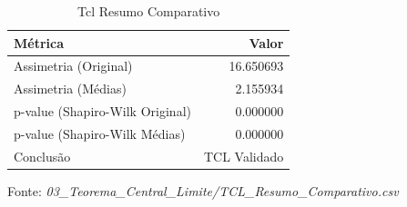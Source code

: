 \begin{table}[H]
\centering
\small
\caption{Tcl Resumo Comparativo}
\label{tab:03_03_Teorema_Central_Limite}
\begin{tabular}{|l|r|}
\hline
\textbf{Métrica} & \textbf{Valor} \\
\hline
Assimetria (Original) & 16.650693 \\
Assimetria (Médias) & 2.155934 \\
p-value (Shapiro-Wilk Original) & 0.000000 \\
p-value (Shapiro-Wilk Médias) & 0.000000 \\
Conclusão & TCL Validado \\
\hline
\end{tabular}
\begin{flushleft}
\small Fonte: \textit{03_Teorema_Central_Limite/TCL_Resumo_Comparativo.csv}
\end{flushleft}
\end{table}
